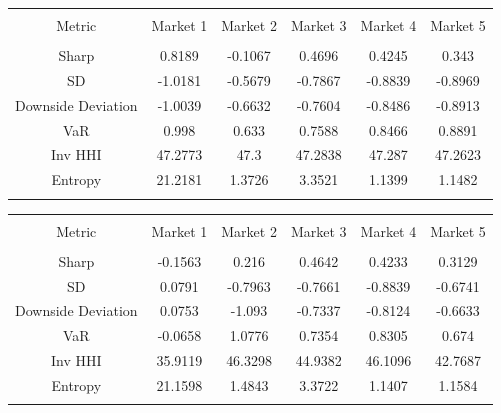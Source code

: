 \documentclass[11pt,preprint, authoryear]{elsarticle}
\let\origtable\table
\let\endorigtable\endtable
\renewenvironment{table}[1][2] {
    \expandafter\origtable\expandafter[H]
} {
    \endorigtable
}
\numberwithin{equation}{section}
\numberwithin{figure}{section}
\numberwithin{table}{section}
\begin{document}
\begin{table}[!htbp] \centering 
  \caption{Inverse Volatility} 
  \label{iv} 
\begin{tabular}{@{\extracolsep{5pt}} cccccc} 
\\[-1.8ex]\hline 
\hline \\[-1.8ex] 
Metric & Market 1 & Market 2 & Market 3 & Market 4 & Market 5 \\ 
\hline \\[-1.8ex] 
Sharp & 0.8189 & -0.1067 & 0.4696 & 0.4245 & 0.343 \\ 
SD & -1.0181 & -0.5679 & -0.7867 & -0.8839 & -0.8969 \\ 
Downside Deviation & -1.0039 & -0.6632 & -0.7604 & -0.8486 & -0.8913 \\ 
VaR & 0.998 & 0.633 & 0.7588 & 0.8466 & 0.8891 \\ 
Inv HHI & 47.2773 & 47.3 & 47.2838 & 47.287 & 47.2623 \\ 
Entropy & 21.2181 & 1.3726 & 3.3521 & 1.1399 & 1.1482 \\ 
\hline \\[-1.8ex] 
\end{tabular} 
\end{table}

\begin{table}[!htbp] \centering 
  \caption{Equal Risk Contribution} 
  \label{erc} 
\begin{tabular}{@{\extracolsep{5pt}} cccccc} 
\\[-1.8ex]\hline 
\hline \\[-1.8ex] 
Metric & Market 1 & Market 2 & Market 3 & Market 4 & Market 5 \\ 
\hline \\[-1.8ex] 
Sharp & -0.1563 & 0.216 & 0.4642 & 0.4233 & 0.3129 \\ 
SD & 0.0791 & -0.7963 & -0.7661 & -0.8839 & -0.6741 \\ 
Downside Deviation & 0.0753 & -1.093 & -0.7337 & -0.8124 & -0.6633 \\ 
VaR & -0.0658 & 1.0776 & 0.7354 & 0.8305 & 0.674 \\ 
Inv HHI & 35.9119 & 46.3298 & 44.9382 & 46.1096 & 42.7687 \\ 
Entropy & 21.1598 & 1.4843 & 3.3722 & 1.1407 & 1.1584 \\ 
\hline \\[-1.8ex] 
\end{tabular} 
\end{table}
\end{document}
